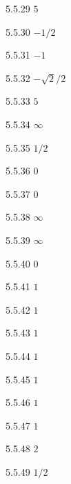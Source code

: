 \begin{Answer}{5.5.29}
 $5$
\end{Answer}
\begin{Answer}{5.5.30}
 $-1/2$
\end{Answer}
\begin{Answer}{5.5.31}
  {$-1$}
\end{Answer}
\begin{Answer}{5.5.32}
 {$-\sqrt{2}/2$}
\end{Answer}
\begin{Answer}{5.5.33}
  {$5$}
\end{Answer}
\begin{Answer}{5.5.34}
 {$\infty$}
\end{Answer}
\begin{Answer}{5.5.35}
  {$1/2$}
\end{Answer}
\begin{Answer}{5.5.36}
  {$0$}
\end{Answer}
\begin{Answer}{5.5.37}
  {$0$}
\end{Answer}
\begin{Answer}{5.5.38}
 {$\infty$}
\end{Answer}
\begin{Answer}{5.5.39}
 {$\infty$}
\end{Answer}
\begin{Answer}{5.5.40}
 {$0$}
\end{Answer}
\begin{Answer}{5.5.41}
 {$1$}
\end{Answer}
\begin{Answer}{5.5.42}
 {$1$}
\end{Answer}
\begin{Answer}{5.5.43}
 {$1$}
\end{Answer}
\begin{Answer}{5.5.44}
 {$1$}
\end{Answer}
\begin{Answer}{5.5.45}
{$1$}
\end{Answer}
\begin{Answer}{5.5.46}
 {$1$}
\end{Answer}
\begin{Answer}{5.5.47}
  {$1$}
\end{Answer}
\begin{Answer}{5.5.48}
 {$2$}
\end{Answer}
\begin{Answer}{5.5.49}
{$1/2$}
\end{Answer}
